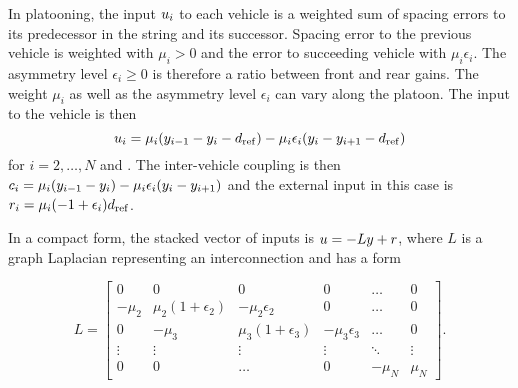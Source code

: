 \documentclass[technote, 10pt, twoside]{IEEEtran}
\newcommand{\relCoupling}{c}
\newcommand{\weightGain}{\mu}
\newcommand{\systemOutput}{y}
\newcommand{\systemOutputVect}{{\systemOutput}}
\newcommand{\numVeh}{N}
\newcommand{\lapl}{{L}}
\newcommand{\inpVect}{{\inp}}
\theoremstyle{plain}
\theoremstyle{definition}
\theoremstyle{assump}
\begin{document}
In platooning, the input $u_i$ to each vehicle is a weighted sum of
spacing errors to its predecessor in the string and its successor. Spacing error
to the previous vehicle is weighted with $\weightGain_i>0$ and the error to
succeeding vehicle with $\weightGain_i \epsilon_i$. The asymmetry level
$\epsilon_i \geq 0$ is therefore a ratio between front and rear gains. The
weight $\weightGain_i$ as well as the asymmetry level $\epsilon_i$ can vary
along the platoon. The input to the vehicle is then
\begin{equation}
	\totalInput_i = \weightGain_i(\pos_{i-1}-\pos_{i}-\dreference) -
	\weightGain_i \epsilon_i(\pos_i- \pos_{i+1}-\dreference)
	\label{eq:regError}
\end{equation}
for $i=2, \ldots, \numVeh$ and . The inter-vehicle coupling
is then $\relCoupling_i = \weightGain_i(\pos_{i-1}-\pos_{i}) - \weightGain_i
\epsilon_i(\pos_i-\pos_{i+1})$ and the external input in this case is
$\inp_i=\weightGain_i(-1+\epsilon_i)\dreference$. 
	
In a compact form, the stacked vector of inputs is $\totalInput = -\lapl \systemOutputVect + \inpVect$, where $\lapl$ is a graph Laplacian representing an interconnection and has a form 
\vspace{-5pt}

{
\setlength{\arraycolsep}{2pt}
\begin{equation}
\lapl= \left[ \begin{matrix}
							0 & 0 & 0 & 0 & \ldots & 0 \\
							-\weightGain_2 & \weightGain_2(1+\epsilon_2) & -\weightGain_2 \epsilon_2
							& 0 & \ldots & 0
							\\
							0 & -\weightGain_3 & \weightGain_3(1+\epsilon_3) &
							-\weightGain_3\epsilon_3 & \ldots & 0
							\\
							\vdots & \vdots & \vdots & \vdots & \ddots & \vdots \\
							0 & 0 & \ldots &  0 & -\weightGain_\numVeh & \weightGain_\numVeh
 							\end{matrix} 
							\right].
							\label{eq:laplacian}
\end{equation}
}
\setlength{\arraycolsep}{3pt}
\end{document}
